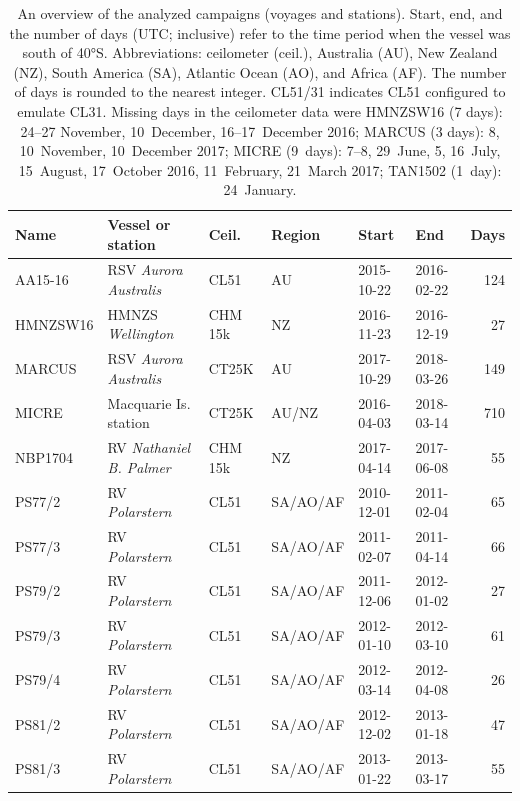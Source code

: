 \documentclass[draft]{agujournal2019}
\begin{document}
\begin{table}[p!]
\caption{
An overview of the analyzed campaigns (voyages and stations). Start, end, and the number of days (UTC; inclusive) refer to the time period when the vessel was south of 40°S. Abbreviations: ceilometer (ceil.), Australia (AU), New Zealand (NZ), South America (SA), Atlantic Ocean (AO), and Africa (AF). The number of days is rounded to the nearest integer. CL51/31 indicates CL51 configured to emulate CL31. Missing days in the ceilometer data were HMNZSW16 (7 days): 24--27 November, 10~December, 16--17~December 2016; MARCUS (3 days): 8, 10~November, 10~December 2017; MICRE (9~days): 7--8, 29~June, 5, 16~July, 15~August, 17~October 2016, 11~February, 21~March 2017; TAN1502 (1~day): 24~January.
}
\label{tab:voyages}
\centering
\small
\begin{tabular}{llllllr}
\textbf{Name} & \textbf{Vessel or station} & \textbf{Ceil.} & \textbf{Region} & \textbf{Start} & \textbf{End} & \textbf{Days}\\
\hline
AA15-16  & RSV \emph{Aurora Australis}   & CL51    & AU       & 2015-10-22 & 2016-02-22 & 124 \\
HMNZSW16 & HMNZS \emph{Wellington}       & CHM 15k & NZ       & 2016-11-23 & 2016-12-19 & 27 \\
MARCUS   & RSV \emph{Aurora Australis}   & CT25K   & AU       & 2017-10-29 & 2018-03-26 & 149 \\
MICRE    & Macquarie Is. station         & CT25K   & AU/NZ    & 2016-04-03 & 2018-03-14 & 710 \\
NBP1704  & RV \emph{Nathaniel B. Palmer} & CHM 15k & NZ       & 2017-04-14 & 2017-06-08 & 55 \\
PS77/2   & RV \emph{Polarstern}          & CL51    & SA/AO/AF & 2010-12-01 & 2011-02-04 & 65 \\
PS77/3   & RV \emph{Polarstern}          & CL51    & SA/AO/AF & 2011-02-07 & 2011-04-14 & 66 \\
PS79/2   & RV \emph{Polarstern}          & CL51    & SA/AO/AF & 2011-12-06 & 2012-01-02 & 27 \\
PS79/3   & RV \emph{Polarstern}          & CL51    & SA/AO/AF & 2012-01-10 & 2012-03-10 & 61 \\
PS79/4   & RV \emph{Polarstern}          & CL51    & SA/AO/AF & 2012-03-14 & 2012-04-08 & 26 \\
PS81/2   & RV \emph{Polarstern}          & CL51    & SA/AO/AF & 2012-12-02 & 2013-01-18 & 47 \\
PS81/3   & RV \emph{Polarstern}          & CL51    & SA/AO/AF & 2013-01-22 & 2013-03-17 & 55 \\

\end{tabular}
\end{table}
\end{document}
